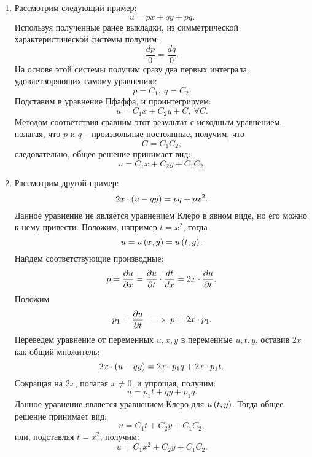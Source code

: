 		\begin{enumerate}
			\item Рассмотрим следующий пример:
				\[ u = px + qy + pq. \]
				Используя полученные ранее выкладки, из симметрической характеристической системы получим:
				\[ \frac{dp}{0} = \frac{dq}{0}. \]
				На основе этой системы получим сразу два первых интеграла, удовлетворяющих самому уравнению:
				\[ p = C_1, ~ q = C_2. \]
				Подставим в уравнение Пфаффа, и проинтегрируем:
				\[ u = C_1 x + C_2 y + C, ~ \forall C. \]
				Методом соответствия сравним этот результат с исходным уравнением, полагая, что $p$ и $q$ -- произвольные постоянные, получим, что
				\[ C = C_1 C_2, \]
				следовательно, общее решение принимает вид:
				\[ u = C_1 x + C_2 y + C_1 C_2. \]

			\item Рассмотрим другой пример:
				\[ 2x \cdot \left( u - qy \right) = pq + px^2. \]
				Данное уравнение не является уравнением Клеро в явном виде, но его можно к нему привести. Положим, например $t = x^2$, тогда
				\[ u = u \left( x, y \right) = u \left( t, y \right). \]
				Найдем соответствующие производные:
				\[ p = \dfrac{\partial u}{\partial x} = \dfrac{\partial u}{\partial t} \cdot \dfrac{d t}{d x} = 2x \cdot \dfrac{\partial u}{\partial t}. \]
				Положим
				\[ p_1 = \dfrac{\partial u}{\partial t} ~ \implies p = 2x \cdot p_1. \]
				Переведем уравнение от переменных $u, x, y$ в переменные $u, t, y$, оставив $2x$ как общий множитель:
				\[ 2 x \cdot \left( u - qy \right) = 2 x \cdot p_1 q + 2 x \cdot p_1 t. \]
				Сокращая на $2 x$, полагая $x \neq 0$, и упрощая, получим:
				\[ u = p_1 t + qy + p_1 q. \]
				Данное уравнение является уравнением Клеро для $u \left( t, y \right)$. Тогда общее решение принимает вид:
				\[ u = C_1 t + C_2 y + C_1 C_2, \]
				или, подставляя $t = x^2$, получим:
				\[ u = C_1 x^2 + C_2 y + C_1 C_2. \]


\end{enumerate}

